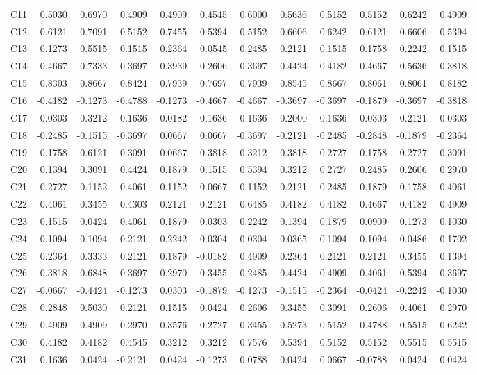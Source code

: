 \documentclass[10pt,a4paper]{article}
\begin{document}
{{\begin{longtable}{@{}l*{11}{r}@{}}
C11 & 0.5030 & 0.6970 & 0.4909 & 0.4909 & 0.4545 & 0.6000 & 0.5636 & 0.5152 & 0.5152 & 0.6242 & 0.4909 \\
C12 & 0.6121 & 0.7091 & 0.5152 & 0.7455 & 0.5394 & 0.5152 & 0.6606 & 0.6242 & 0.6121 & 0.6606 & 0.5394 \\
C13 & 0.1273 & 0.5515 & 0.1515 & 0.2364 & 0.0545 & 0.2485 & 0.2121 & 0.1515 & 0.1758 & 0.2242 & 0.1515 \\
C14 & 0.4667 & 0.7333 & 0.3697 & 0.3939 & 0.2606 & 0.3697 & 0.4424 & 0.4182 & 0.4667 & 0.5636 & 0.3818 \\
C15 & 0.8303 & 0.8667 & 0.8424 & 0.7939 & 0.7697 & 0.7939 & 0.8545 & 0.8667 & 0.8061 & 0.8061 & 0.8182 \\
C16 & -0.4182 & -0.1273 & -0.4788 & -0.1273 & -0.4667 & -0.4667 & -0.3697 & -0.3697 & -0.1879 & -0.3697 & -0.3818 \\
C17 & -0.0303 & -0.3212 & -0.1636 & 0.0182 & -0.1636 & -0.1636 & -0.2000 & -0.1636 & -0.0303 & -0.2121 & -0.0303 \\
C18 & -0.2485 & -0.1515 & -0.3697 & 0.0667 & 0.0667 & -0.3697 & -0.2121 & -0.2485 & -0.2848 & -0.1879 & -0.2364 \\
C19 & 0.1758 & 0.6121 & 0.3091 & 0.0667 & 0.3818 & 0.3212 & 0.3818 & 0.2727 & 0.1758 & 0.2727 & 0.3091 \\
C20 & 0.1394 & 0.3091 & 0.4424 & 0.1879 & 0.1515 & 0.5394 & 0.3212 & 0.2727 & 0.2485 & 0.2606 & 0.2970 \\
C21 & -0.2727 & -0.1152 & -0.4061 & -0.1152 & 0.0667 & -0.1152 & -0.2121 & -0.2485 & -0.1879 & -0.1758 & -0.4061 \\
C22 & 0.4061 & 0.3455 & 0.4303 & 0.2121 & 0.2121 & 0.6485 & 0.4182 & 0.4182 & 0.4667 & 0.4182 & 0.4909 \\
C23 & 0.1515 & 0.0424 & 0.4061 & 0.1879 & 0.0303 & 0.2242 & 0.1394 & 0.1879 & 0.0909 & 0.1273 & 0.1030 \\
C24 & -0.1094 & 0.1094 & -0.2121 & 0.2242 & -0.0304 & -0.0304 & -0.0365 & -0.1094 & -0.1094 & -0.0486 & -0.1702 \\
C25 & 0.2364 & 0.3333 & 0.2121 & 0.1879 & -0.0182 & 0.4909 & 0.2364 & 0.2121 & 0.2121 & 0.3455 & 0.1394 \\
C26 & -0.3818 & -0.6848 & -0.3697 & -0.2970 & -0.3455 & -0.2485 & -0.4424 & -0.4909 & -0.4061 & -0.5394 & -0.3697 \\
C27 & -0.0667 & -0.4424 & -0.1273 & 0.0303 & -0.1879 & -0.1273 & -0.1515 & -0.2364 & -0.0424 & -0.2242 & -0.1030 \\
C28 & 0.2848 & 0.5030 & 0.2121 & 0.1515 & 0.0424 & 0.2606 & 0.3455 & 0.3091 & 0.2606 & 0.4061 & 0.2970 \\
C29 & 0.4909 & 0.4909 & 0.2970 & 0.3576 & 0.2727 & 0.3455 & 0.5273 & 0.5152 & 0.4788 & 0.5515 & 0.6242 \\
C30 & 0.4182 & 0.4182 & 0.4545 & 0.3212 & 0.3212 & 0.7576 & 0.5394 & 0.5152 & 0.5152 & 0.5515 & 0.5515 \\
C31 & 0.1636 & 0.0424 & -0.2121 & 0.0424 & -0.1273 & 0.0788 & 0.0424 & 0.0667 & -0.0788 & 0.0424 & 0.0424 \\
\end{longtable}
}

}
\end{document}
